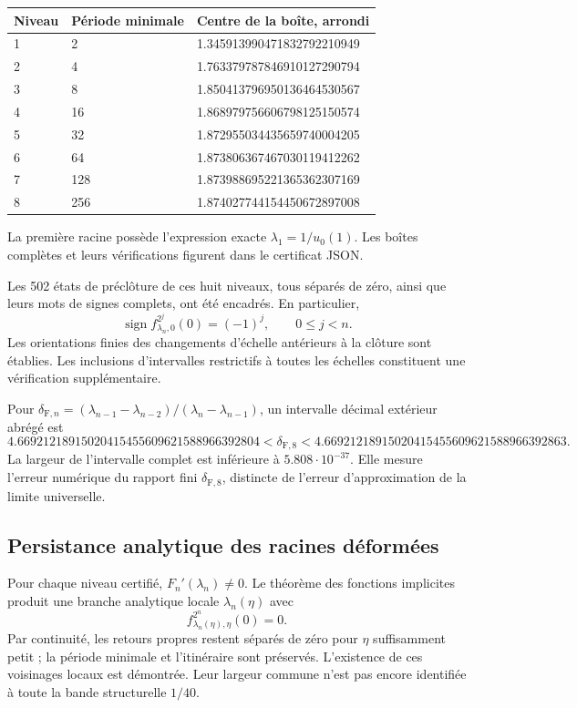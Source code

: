 \begingroup\small
\begin{longtable}{p{.12\linewidth}p{.17\linewidth}p{.62\linewidth}}
\hline
Niveau & Période minimale & Centre de la boîte, arrondi \\
\hline
1 & 2 & 1.345913990471832792210949 \\
2 & 4 & 1.763379787846910127290794 \\
3 & 8 & 1.850413796950136464530567 \\
4 & 16 & 1.868979756606798125150574 \\
5 & 32 & 1.872955034435659740004205 \\
6 & 64 & 1.873806367467030119412262 \\
7 & 128 & 1.873988695221365362307169 \\
8 & 256 & 1.874027744154450672897008 \\
\hline\end{longtable}
\endgroup

La première racine possède l’expression exacte \(\lambda_1=1/u_0(1)\). Les boîtes complètes et leurs vérifications figurent dans le certificat JSON.

Les 502 états de préclôture de ces huit niveaux, tous séparés de zéro, ainsi que leurs mots de signes complets, ont été encadrés. En particulier,
\[
\operatorname{sign}f_{\lambda_n,0}^{2^j}(0)=(-1)^j,\qquad0\le j<n.
\]
Les orientations finies des changements d’échelle antérieurs à la clôture sont établies. Les inclusions d’intervalles restrictifs à toutes les échelles constituent une vérification supplémentaire.

Pour \(\delta_{\mathrm F,n}=(\lambda_{n-1}-\lambda_{n-2})/(\lambda_n-\lambda_{n-1})\), un intervalle décimal extérieur abrégé est
\[
\boxed{
4.66921218915020415455609621588966392804
<\delta_{\mathrm F,8}<
4.66921218915020415455609621588966392863.
}
\]
La largeur de l’intervalle complet est inférieure à \(5.808\cdot10^{-37}\). Elle mesure l’erreur numérique du rapport fini \(\delta_{\mathrm F,8}\), distincte de l’erreur d’approximation de la limite universelle.


\subsection{Persistance analytique des racines déformées}
\label{hmtfg:desarrollo:8}

Pour chaque niveau certifié, \(F_n'(\lambda_n)\ne0\). Le théorème des fonctions implicites produit une branche analytique locale \(\lambda_n(\eta)\) avec
\[
f_{\lambda_n(\eta),\eta}^{2^n}(0)=0.
\]
Par continuité, les retours propres restent séparés de zéro pour \(\eta\) suffisamment petit ; la période minimale et l’itinéraire sont préservés. L’existence de ces voisinages locaux est démontrée. Leur largeur commune n’est pas encore identifiée à toute la bande structurelle \(1/40\).

